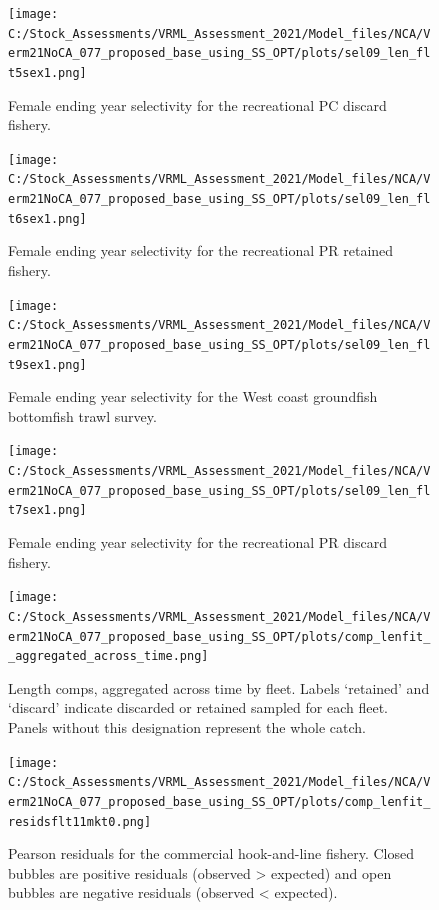 \documentclass[11pt,
  english,
  a4paper,
]{article}
\begin{document}
\begin{figure}
\centering
\texttt{[image: C:/Stock\_Assessments/VRML\_Assessment\_2021/Model\_files/NCA/Verm21NoCA\_077\_proposed\_base\_using\_SS\_OPT/plots/sel09\_len\_flt5sex1.png]}
\caption{Female ending year selectivity for the recreational PC discard fishery.\label{fig:endyr-selex-REC-PC-DIS}}
\end{figure}

\begin{figure}
\centering
\texttt{[image: C:/Stock\_Assessments/VRML\_Assessment\_2021/Model\_files/NCA/Verm21NoCA\_077\_proposed\_base\_using\_SS\_OPT/plots/sel09\_len\_flt6sex1.png]}
\caption{Female ending year selectivity for the recreational PR retained fishery.\label{fig:endyr-selex-REC-PR}}
\end{figure}

\begin{figure}
\centering
\texttt{[image: C:/Stock\_Assessments/VRML\_Assessment\_2021/Model\_files/NCA/Verm21NoCA\_077\_proposed\_base\_using\_SS\_OPT/plots/sel09\_len\_flt9sex1.png]}
\caption{Female ending year selectivity for the West coast groundfish bottomfish trawl survey.\label{fig:endyr-selex-NWFSC-TWL}}
\end{figure}

\begin{figure}
\centering
\texttt{[image: C:/Stock\_Assessments/VRML\_Assessment\_2021/Model\_files/NCA/Verm21NoCA\_077\_proposed\_base\_using\_SS\_OPT/plots/sel09\_len\_flt7sex1.png]}
\caption{Female ending year selectivity for the recreational PR discard fishery.\label{fig:endyr-selex-REC-PR-DIS}}
\end{figure}

\FloatBarrier

\FloatBarrier

\begin{figure}
\centering
\texttt{[image: C:/Stock\_Assessments/VRML\_Assessment\_2021/Model\_files/NCA/Verm21NoCA\_077\_proposed\_base\_using\_SS\_OPT/plots/comp\_lenfit\_\_aggregated\_across\_time.png]}
\caption{Length comps, aggregated across time by fleet. Labels `retained' and `discard' indicate discarded or retained sampled for each fleet. Panels without this designation represent the whole catch.\label{fig:lenfits-all}}
\end{figure}

\begin{figure}
\centering
\texttt{[image: C:/Stock\_Assessments/VRML\_Assessment\_2021/Model\_files/NCA/Verm21NoCA\_077\_proposed\_base\_using\_SS\_OPT/plots/comp\_lenfit\_residsflt11mkt0.png]}
\caption{Pearson residuals for the commercial hook-and-line fishery. Closed bubbles are positive residuals (observed \textgreater{} expected) and open bubbles are negative residuals (observed \textless{} expected).\label{fig:len-pearson-COM-HKL}}
\end{figure}
\end{document}
